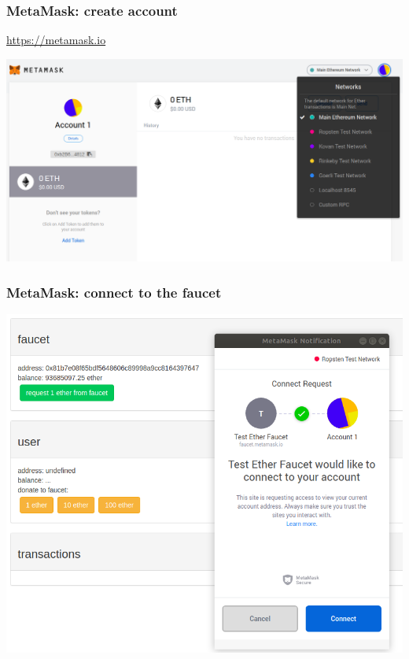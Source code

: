 \documentclass[11pt]{beamer}  %
\begin{document}
\begin{frame}\frametitle{MetaMask: create account}

  \url{https://metamask.io}
  \begin{center}
    \includegraphics[width=\textwidth,clip=false]{pictures/metamask-account.png}
  \end{center}

\end{frame}

\begin{frame}\frametitle{MetaMask: connect to the faucet}

  \begin{center}
    \includegraphics[scale=0.3,clip=false]{pictures/metamask-faucet.png}
  \end{center}

\end{frame}
\end{document}
